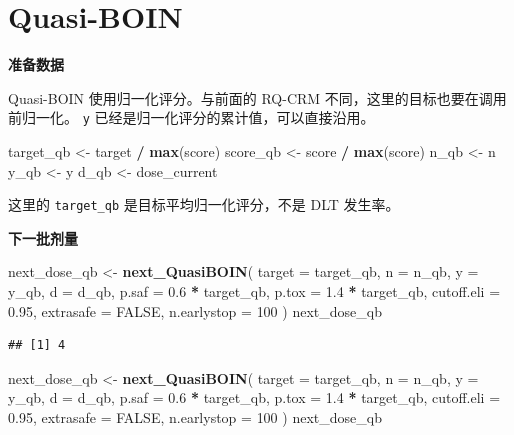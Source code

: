 \documentclass[
  chinese,
]{article}
\newenvironment{Shaded}{\begin{snugshade}}{\end{snugshade}}
\newcommand{\AttributeTok}[1]{\textcolor[rgb]{0.13,0.29,0.53}{#1}}
\newcommand{\ConstantTok}[1]{\textcolor[rgb]{0.56,0.35,0.01}{#1}}
\newcommand{\DecValTok}[1]{\textcolor[rgb]{0.00,0.00,0.81}{#1}}
\newcommand{\FloatTok}[1]{\textcolor[rgb]{0.00,0.00,0.81}{#1}}
\newcommand{\FunctionTok}[1]{\textcolor[rgb]{0.13,0.29,0.53}{\textbf{#1}}}
\newcommand{\NormalTok}[1]{#1}
\newcommand{\OtherTok}[1]{\textcolor[rgb]{0.56,0.35,0.01}{#1}}
\newcommand{\SpecialCharTok}[1]{\textcolor[rgb]{0.81,0.36,0.00}{\textbf{#1}}}
\begin{document}
\section{Quasi-BOIN}\label{quasi-boin}

\textbf{准备数据}

Quasi-BOIN 使用归一化评分。与前面的 RQ-CRM
不同，这里的目标也要在调用前归一化。 \texttt{y}
已经是归一化评分的累计值，可以直接沿用。

\begin{Shaded}
\begin{Highlighting}[]
\NormalTok{target\_qb }\OtherTok{\textless{}{-}}\NormalTok{ target }\SpecialCharTok{/} \FunctionTok{max}\NormalTok{(score)}
\NormalTok{score\_qb }\OtherTok{\textless{}{-}}\NormalTok{ score }\SpecialCharTok{/} \FunctionTok{max}\NormalTok{(score)}
\NormalTok{n\_qb }\OtherTok{\textless{}{-}}\NormalTok{ n}
\NormalTok{y\_qb }\OtherTok{\textless{}{-}}\NormalTok{ y}
\NormalTok{d\_qb }\OtherTok{\textless{}{-}}\NormalTok{ dose\_current}
\end{Highlighting}
\end{Shaded}

这里的 \texttt{target\_qb} 是目标平均归一化评分，不是 DLT 发生率。

\textbf{下一批剂量}

\begin{Shaded}
\begin{Highlighting}[]
\NormalTok{next\_dose\_qb }\OtherTok{\textless{}{-}} \FunctionTok{next\_QuasiBOIN}\NormalTok{(}
  \AttributeTok{target =}\NormalTok{ target\_qb, }\AttributeTok{n =}\NormalTok{ n\_qb, }\AttributeTok{y =}\NormalTok{ y\_qb, }\AttributeTok{d =}\NormalTok{ d\_qb,}
  \AttributeTok{p.saf =} \FloatTok{0.6} \SpecialCharTok{*}\NormalTok{ target\_qb, }\AttributeTok{p.tox =} \FloatTok{1.4} \SpecialCharTok{*}\NormalTok{ target\_qb,}
  \AttributeTok{cutoff.eli =} \FloatTok{0.95}\NormalTok{, }\AttributeTok{extrasafe =} \ConstantTok{FALSE}\NormalTok{, }\AttributeTok{n.earlystop =} \DecValTok{100}
\NormalTok{)}
\NormalTok{next\_dose\_qb}
\end{Highlighting}
\end{Shaded}

\begin{verbatim}
## [1] 4
\end{verbatim}

\begin{Shaded}
\begin{Highlighting}[]
\NormalTok{next\_dose\_qb }\OtherTok{\textless{}{-}} \FunctionTok{next\_QuasiBOIN}\NormalTok{(}
  \AttributeTok{target =}\NormalTok{ target\_qb, }\AttributeTok{n =}\NormalTok{ n\_qb, }\AttributeTok{y =}\NormalTok{ y\_qb, }\AttributeTok{d =}\NormalTok{ d\_qb,}
  \AttributeTok{p.saf =} \FloatTok{0.6} \SpecialCharTok{*}\NormalTok{ target\_qb, }\AttributeTok{p.tox =} \FloatTok{1.4} \SpecialCharTok{*}\NormalTok{ target\_qb,}
  \AttributeTok{cutoff.eli =} \FloatTok{0.95}\NormalTok{, }\AttributeTok{extrasafe =} \ConstantTok{FALSE}\NormalTok{, }\AttributeTok{n.earlystop =} \DecValTok{100}
\NormalTok{)}
\NormalTok{next\_dose\_qb}
\end{Highlighting}
\end{Shaded}
\end{document}
